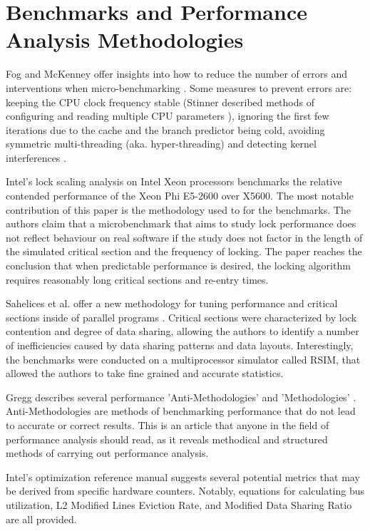 \section{Benchmarks and Performance Analysis Methodologies}
Fog and McKenney offer insights into how to reduce the number of errors and interventions when micro-benchmarking \cite{fog1996optimizing,fog2020optimizing, mckenney2017parallel}. Some measures to prevent errors are: keeping the CPU clock frequency stable (Stinner described methods of configuring and reading multiple CPU parameters \cite{stinnerpstate}), ignoring the first few iterations due to the cache and the branch predictor being cold\cite{fog1996optimizing}, avoiding symmetric multi-threading (aka. hyper-threading) \cite{fog2020optimizing} and detecting kernel interferences \cite[Chapter~11.7]{mckenney2017parallel}.

Intel's lock scaling analysis on Intel Xeon processors \cite{intelxeonlockscaling} benchmarks the relative contended performance of the Xeon Phi E5-2600 over X5600. The most notable contribution of this paper is the methodology used to for the benchmarks. The authors claim that a microbenchmark that aims to study lock performance does not reflect behaviour on real software if the study does not factor in the length of the simulated critical section and the frequency of locking. The paper reaches the conclusion that when predictable performance is desired, the locking algorithm requires reasonably long critical sections and re-entry times.

Sahelices et al. offer a new methodology for tuning performance and critical sections inside of parallel programs \cite{sahelices2009methodology}. Critical sections were characterized by lock contention and degree of data sharing, allowing the authors to identify a number of inefficiencies caused by data sharing patterns and data layouts. Interestingly, the benchmarks were conducted on a multiprocessor simulator called RSIM, that allowed the authors to take fine grained and accurate statistics.

Gregg describes several performance 'Anti-Methodologies' and 'Methodologies' \cite{methodologygregg}. Anti-Methodologies are methods of benchmarking performance that do not lead to accurate or correct results. This is an article that anyone in the field of performance analysis should read, as it reveals methodical and structured methods of carrying out performance analysis.

Intel's optimization reference manual \cite{intelmanualoptimization} suggests several potential metrics that may be derived from specific hardware counters. Notably, equations for calculating bus utilization, L2 Modified Lines Eviction Rate, and Modified Data Sharing Ratio are all provided.
